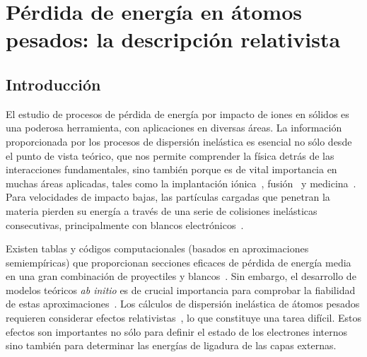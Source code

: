 \chapter{Pérdida de energía en átomos pesados: la descripción relativista}
\label{chap:heavy}

\section{Introducción}
\label{sec:intro}

El estudio de procesos de pérdida de energía por impacto de iones 
en sólidos es una poderosa herramienta, con aplicaciones en diversas 
áreas. La información proporcionada por los procesos de dispersión 
inelástica es esencial no sólo desde el punto de vista teórico, que nos 
permite comprender la física detrás de las interacciones fundamentales, 
sino también porque es de vital importancia en muchas áreas aplicadas, 
tales como la implantación iónica~\cite{Creutzburg:19,Jeynes:16}, 
fusión~\cite{Mayer:20,He:17} y 
medicina~\cite{Schardt:10,AlcocerAvila:19,Vera:19}.
Para velocidades de impacto bajas, las partículas cargadas que penetran 
la materia pierden su energía a través de una serie de colisiones 
inelásticas consecutivas, principalmente con blancos 
electrónicos~\cite{Chu:01,Sigmund:06}. 

Existen tablas y códigos computacionales (basados en aproximaciones 
semiempíricas) que proporcionan secciones eficaces de pérdida de energía 
media en una gran combinación de proyectiles y blancos~\cite{iaea_codes,
Paul:03}. Sin embargo, el desarrollo de modelos teóricos 
\textit{ab initio} es de crucial importancia para comprobar la 
fiabilidad de estas aproximaciones~\cite{Diwan:15,Damache:04,Damache:02}.
Los cálculos de dispersión inelástica de átomos pesados requieren 
considerar efectos relativistas~\cite{Montanari:09}, lo que constituye 
una tarea difícil. Estos efectos son importantes no sólo para definir el 
estado de los electrones internos sino también para determinar las 
energías de ligadura de las capas externas.

